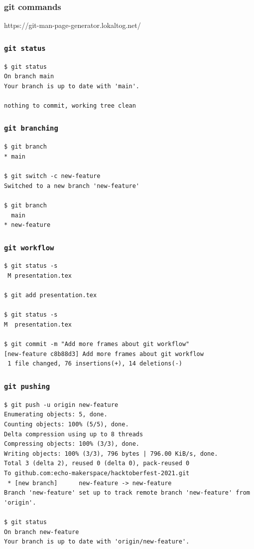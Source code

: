 \documentclass[presentation]{beamer}
\begin{document}
  \begin{frame}[standout]
    \frametitle{git commands}
    https://git-man-page-generator.lokaltog.net/   
  \end{frame}

  \begin{frame}[fragile]
    \frametitle{\texttt{git status}}
 
    \begin{lstlisting}
$ git status
On branch main
Your branch is up to date with 'main'.

nothing to commit, working tree clean
    \end{lstlisting}
  \end{frame}

  \begin{frame}[fragile]
    \frametitle{\texttt{git branching}}
 
    \begin{lstlisting}
$ git branch
* main

$ git switch -c new-feature
Switched to a new branch 'new-feature'

$ git branch
  main
* new-feature
    \end{lstlisting}
  \end{frame}

  \begin{frame}[fragile]
    \frametitle{\texttt{git workflow}}
 
    \begin{lstlisting}
$ git status -s
 M presentation.tex

$ git add presentation.tex 

$ git status -s
M  presentation.tex

$ git commit -m "Add more frames about git workflow"
[new-feature c8b88d3] Add more frames about git workflow
 1 file changed, 76 insertions(+), 14 deletions(-)
    \end{lstlisting}
  \end{frame}

  \begin{frame}[fragile]
    \frametitle{\texttt{git pushing}}
 
    \begin{lstlisting}
$ git push -u origin new-feature
Enumerating objects: 5, done.
Counting objects: 100% (5/5), done.
Delta compression using up to 8 threads
Compressing objects: 100% (3/3), done.
Writing objects: 100% (3/3), 796 bytes | 796.00 KiB/s, done.
Total 3 (delta 2), reused 0 (delta 0), pack-reused 0
To github.com:echo-makerspace/hacktoberfest-2021.git
 * [new branch]      new-feature -> new-feature
Branch 'new-feature' set up to track remote branch 'new-feature' from 'origin'.

$ git status
On branch new-feature
Your branch is up to date with 'origin/new-feature'.
    \end{lstlisting}
  \end{frame}
\end{document}
